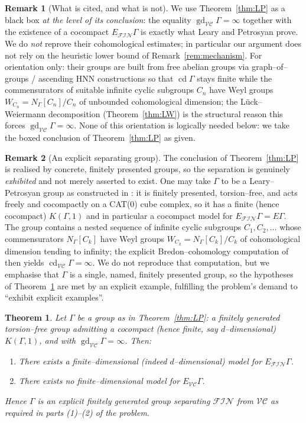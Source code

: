 \documentclass{amsart}
\newtheorem{theorem}{Theorem}
\theoremstyle{definition}
\newtheorem{remark}{Remark}
\newcommand{\FIN}{\mathcal{F\!I\!N}}
\newcommand{\VC}{\mathcal{V\!C}}
\newcommand{\gd}{\operatorname{gd}}
\newcommand{\cd}{\operatorname{cd}}
\begin{document}
\begin{remark}[What is cited, and what is not]\label{rem:blackbox}
We use Theorem~\ref{thm:LP} as a black box \emph{at the level of its conclusion}: the equality
$\gd_{\VC}\Gamma=\infty$ together with the existence of a cocompact $E_{\FIN}\Gamma$ is exactly
what Leary and Petrosyan prove. We do \emph{not} reprove their cohomological estimates; in
particular our argument does not rely on the heuristic lower bound of
Remark~\ref{rem:mechanism}. For orientation only: their groups are built from free abelian
groups via graph--of--groups / ascending HNN constructions so that $\cd\Gamma$ stays finite
while the commensurators of suitable infinite cyclic subgroups $C_n$ have Weyl groups
$W_{C_n}=N_\Gamma[C_n]/C_n$ of unbounded cohomological dimension; the Lück--Weiermann
decomposition (Theorem~\ref{thm:LW}) is the structural reason this forces
$\gd_{\VC}\Gamma=\infty$. None of this orientation is logically needed below: we take the
boxed conclusion of Theorem~\ref{thm:LP} as given.
\end{remark}

\begin{remark}[An explicit separating group]\label{rem:explicit}
The conclusion of Theorem~\ref{thm:LP} is realised by concrete, finitely presented groups, so
the separation is genuinely \emph{exhibited} and not merely asserted to exist. One may take
$\Gamma$ to be a Leary--Petrosyan group as constructed in \cite[\S\S 1--2]{LearyPetrosyan}:
it is finitely presented, torsion--free, and acts freely and cocompactly on a CAT(0) cube
complex, so it has a finite (hence cocompact) $K(\Gamma,1)$ and in particular a cocompact model
for $E_{\FIN}\Gamma=E\Gamma$. The group contains a nested sequence of infinite cyclic subgroups
$C_{1},C_{2},\dots$ whose commensurators $N_\Gamma[C_{k}]$ have Weyl groups
$W_{C_k}=N_\Gamma[C_k]/C_k$ of cohomological dimension tending to infinity; the explicit
Bredon--cohomology computation of \cite[Theorem~B]{LearyPetrosyan} then yields
$\cd_{\VC}\Gamma=\infty$. We do not reproduce that computation, but we emphasise that $\Gamma$
is a single, named, finitely presented group, so the hypotheses of Theorem~\ref{thm:main} are
met by an explicit example, fulfilling the problem's demand to ``exhibit explicit examples''.
\end{remark}

\begin{theorem}\label{thm:main}
Let $\Gamma$ be a group as in Theorem~\ref{thm:LP}: a finitely generated torsion--free group
admitting a cocompact (hence finite, say $d$--dimensional) $K(\Gamma,1)$, and with
$\gd_{\VC}\Gamma=\infty$. Then:
\begin{enumerate}
\item There exists a finite--dimensional (indeed $d$--dimensional) model for $E_{\FIN}\Gamma$.
\item There exists no finite--dimensional model for $E_{\VC}\Gamma$.
\end{enumerate}
Hence $\Gamma$ is an explicit finitely generated group separating $\FIN$ from $\VC$ as
required in parts (1)--(2) of the problem.
\end{theorem}
\end{document}
